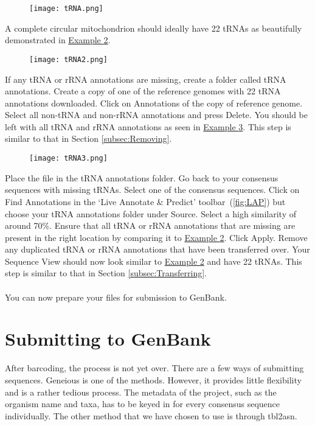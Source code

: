 \documentclass[11pt]{article}
\newcommand{\exautoref}[1]{\hyperref[#1]{Example \ref*{#1}}}
\begin{document}
\begin{figure}[H]
  \centering
    \texttt{[image: tRNA.png]}
  \label{fig:tRNA}
\end{figure}

A complete circular mitochondrion should ideally have 22 tRNAs as beautifully demonstrated in \exautoref{fig:tRNA2}.

\begin{figure}[H]
  \centering
    \texttt{[image: tRNA2.png]}
  \label{fig:tRNA2}
\end{figure}

If any tRNA or rRNA annotations are missing, create a folder called tRNA annotations. Create a copy of one of the reference genomes with 22 tRNA annotations downloaded. Click on Annotations of the copy of reference genome. Select all non-tRNA and non-rRNA annotations and press Delete. You should be left with all tRNA and rRNA annotations as seen in \exautoref{fig:tRNA3}. This step is similar to that in Section \ref{subsec:Removing}.

\begin{figure}[H]
  \centering
    \texttt{[image: tRNA3.png]}
  \label{fig:tRNA3}
\end{figure}

Place the file in the tRNA annotations folder. Go back to your consensus sequences with missing tRNAs. Select one of the consensus sequences. Click on Find Annotations in the `Live Annotate \& Predict' toolbar~(\autoref{fig:LAP}) but choose your tRNA annotations folder under Source. Select a high similarity of around 70\%. Ensure that all tRNA or rRNA annotations that are missing are present in the right location by comparing it to \exautoref{fig:tRNA2}. Click Apply. Remove any duplicated tRNA or rRNA annotations that have been transferred over. Your Sequence View should now look similar to \exautoref{fig:tRNA2} and have 22 tRNAs. This step is similar to that in Section \ref{subsec:Transferring}. 
\\
\\
You can now prepare your files for submission to GenBank.

\newpage
\section{Submitting to GenBank}
\label{sec:Submitting}
After barcoding, the process is not yet over. There are a few ways of submitting sequences. Geneious is one of the methods. However, it provides little flexibility and is a rather tedious process. The metadata of the project, such as the organism name and taxa, has to be keyed in for every consensus sequence individually. The other method that we have chosen to use is through tbl2asn.
\end{document}
